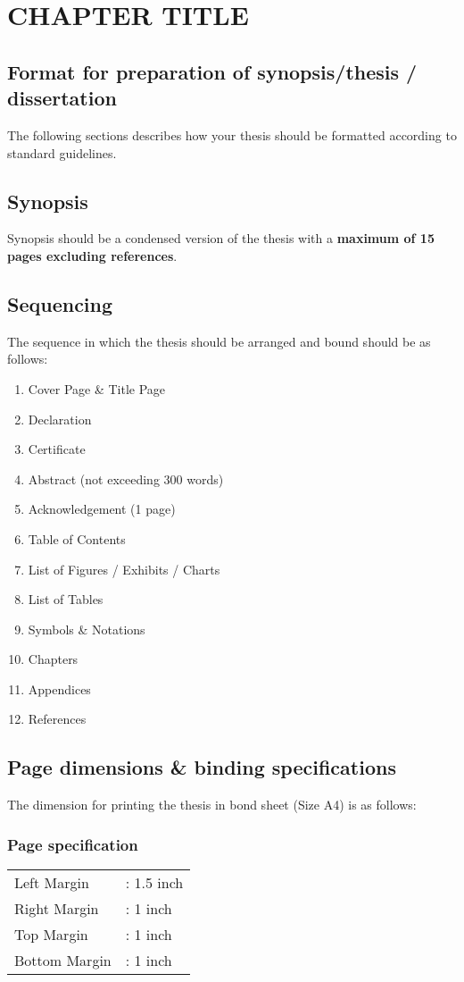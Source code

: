 \chapter{CHAPTER TITLE} \label{c4}
\section{Format for preparation of synopsis/thesis / dissertation}
The following sections describes how your thesis should be formatted according to standard guidelines.
\section{Synopsis}
Synopsis should be a condensed version of the thesis with a \textbf{maximum of 15 pages excluding references}.

\section{Sequencing}
The sequence in which the thesis should be arranged and bound should be as follows:
\begin{enumerate}\itemsep 0em
	\item Cover Page \& Title Page
	\item Declaration 
	\item Certificate
	\item Abstract (not exceeding 300 words)
	\item Acknowledgement (1 page)
	\item Table of Contents
	\item List of Figures / Exhibits / Charts 
	\item List of Tables 
	\item Symbols \& Notations
	\item Chapters
	\item Appendices
	\item References	
\end{enumerate}

\section{Page dimensions \& binding specifications}
The dimension for printing the thesis in bond sheet (Size A4) is as follows:

\subsection{Page specification}
\begin{table}[htb]
	\begin{tabular}{ll}
	Left Margin 		&: 1.5 inch \\
	Right Margin		&: 1 inch \\
	Top Margin		&: 1 inch \\
	Bottom Margin	&: 1 inch 
	
	\end{tabular}	
\end{table}

